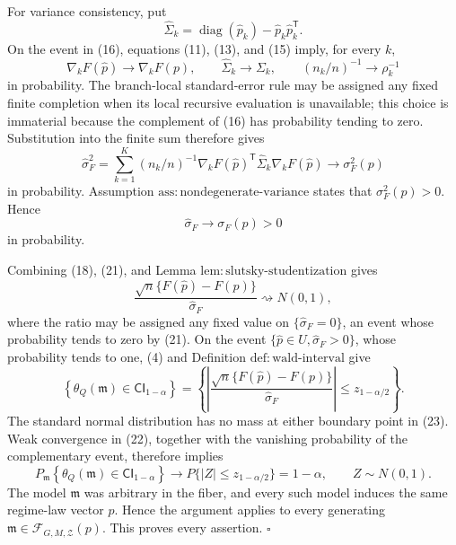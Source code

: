 For variance consistency, put
\[
 \widehat\Sigma_k
 =\operatorname{diag}(\widehat p_k)
  -\widehat p_k\widehat p_k^{\mathsf T}.
\]
On the event in (16), equations (11), (13), and (15) imply, for every \(k\),
\[
 \nabla_kF(\widehat p)\to\nabla_kF(p),
 \qquad
 \widehat\Sigma_k\to\Sigma_k,
 \qquad
 (n_k/n)^{-1}\to\rho_k^{-1} \tag{19}
\]
in probability.  The branch-local standard-error rule may be assigned any fixed finite completion when its local recursive evaluation is unavailable; this choice is immaterial because the complement of (16) has probability tending to zero.  Substitution into the finite sum therefore gives
\[
 \widehat\sigma_F^2
 =\sum_{k=1}^{K}(n_k/n)^{-1}
   \nabla_kF(\widehat p)^{\mathsf T}
   \widehat\Sigma_k
   \nabla_kF(\widehat p)
 \longrightarrow\sigma_F^2(p) \tag{20}
\]
in probability.  Assumption \(\mathrm{ass:nondegenerate\text{-}variance}\) states that \(\sigma_F^2(p)>0\).  Hence
\[
 \widehat\sigma_F\longrightarrow\sigma_F(p)>0 \tag{21}
\]
in probability.

Combining (18), (21), and Lemma \(\mathrm{lem:slutsky\text{-}studentization}\) gives
\[
 \frac{\sqrt n\{F(\widehat p)-F(p)\}}
      {\widehat\sigma_F}
 \rightsquigarrow N(0,1), \tag{22}
\]
where the ratio may be assigned any fixed value on \(\{\widehat\sigma_F=0\}\), an event whose probability tends to zero by (21).  On the event \(\{\widehat p\in U,\widehat\sigma_F>0\}\), whose probability tends to one, (4) and Definition \(\mathrm{def:wald\text{-}interval}\) give
\[
 \left\{
 \theta_Q(\mathfrak m)\in\mathsf{CI}_{1-\alpha}
 \right\}
 =
 \left\{
 \left|
 \frac{\sqrt n\{F(\widehat p)-F(p)\}}
      {\widehat\sigma_F}
 \right|
 \leq z_{1-\alpha/2}
 \right\}. \tag{23}
\]
The standard normal distribution has no mass at either boundary point in (23).  Weak convergence in (22), together with the vanishing probability of the complementary event, therefore implies
\[
 P_{\mathfrak m}\!\left\{
 \theta_Q(\mathfrak m)\in\mathsf{CI}_{1-\alpha}
 \right\}
 \longrightarrow
 P\{|Z|\leq z_{1-\alpha/2}\}
 =1-\alpha,
 \qquad Z\sim N(0,1). \tag{24}
\]
The model \(\mathfrak m\) was arbitrary in the fiber, and every such model induces the same regime-law vector \(p\).  Hence the argument applies to every generating \(\mathfrak m\in\mathcal F_{G,M,\mathcal Z}(p)\).  This proves every assertion. \(\square\)